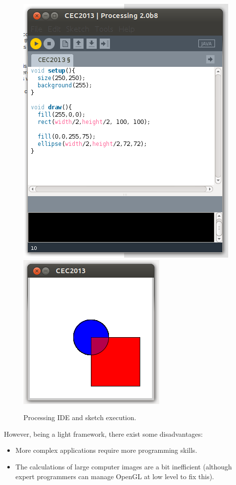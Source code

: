 \begin{figure}
\centering

   \includegraphics[scale =0.55] {gfx/art/Processing.png}
   \includegraphics[scale =0.45] {gfx/art/run.png}

\label{fig:ideProc}
\caption{Processing IDE and sketch execution. }
\end{figure}

However, being a light framework, there exist some disadvantages:
\begin{itemize}
\item More complex applications require more programming skills.
\item The calculations of large computer images are a bit inefficient (although expert programmers can manage OpenGL at low level to fix this).
\end{itemize}

